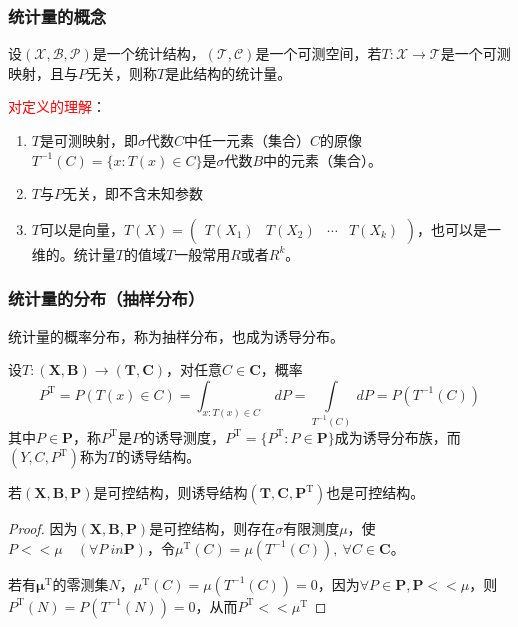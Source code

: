 \subsubsection{统计量的概念}
\begin{definition}[统计量]
    设$(\mathscr{X},\mathscr{B},\mathscr{P})$是一个统计结构，$(\mathscr{T},\mathscr{C})$是一个可测空间，若$T:\mathscr{X}\rightarrow \mathscr{T}$是一个可测映射，且与$P$无关，则称$T$是此结构的统计量。
\end{definition}
\textcolor{red}{对定义的理解}：
\begin{note}
    \begin{enumerate}[label = \arabic*\textsuperscript{$\circ$}]
        \item $T$是可测映射，即$\sigma$代数$C$中任一元素（集合）$C$的原像$T^{-1}(C)=\{x:T(x)\in C\}$是$\sigma$代数$B$中的元素（集合）。
        \item $T$与$P$无关，即不含未知参数
        \item $T$可以是向量，$T(X) = \begin{pmatrix}
            T(X_1) & T(X_2) & \cdots & T(X_k)
        \end{pmatrix}$，也可以是一维的。统计量$T$的值域$T$一般常用$R$或者$R^k$。
    \end{enumerate}
\end{note}
\subsubsection{统计量的分布（抽样分布）}

\begin{definition}[抽样分布]
    统计量的概率分布，称为抽样分布，也成为诱导分布。

    设$T:(\boldsymbol{X},\boldsymbol{B})\rightarrow (\boldsymbol{T},\boldsymbol{C})$，对任意$C\in \boldsymbol{C}$，概率
    \[
        P^{\mathrm{T}}=P(T(x)\in C) = \displaystyle\int_{x:T(x)\in C}\ dP = \displaystyle\int\limits_{T^{-1}(C)}\ dP = P(T^{-1}(C))
    \]
    其中$P\in \boldsymbol{P}$，称$P^{\mathrm{T}}$是$P$的诱导测度，$P^{\mathrm{T}} = \{ P^{\mathrm{T}}: P\in \boldsymbol{P}\}$成为诱导分布族，而$(Y,C,P^{\mathrm{T}})$称为$T$的诱导结构。
\end{definition}

\begin{note}
    若$(\boldsymbol{X},\boldsymbol{B},\boldsymbol{P})$是可控结构，则诱导结构$(\boldsymbol{T},\boldsymbol{C},\boldsymbol{P}^{\mathrm{T}})$也是可控结构。
\end{note}
\begin{proof}
    因为$(\boldsymbol{X},\boldsymbol{B},\boldsymbol{P})$是可控结构，则存在$\sigma$有限测度$\mu$，使$P<<\mu\quad (\forall P\ in \boldsymbol{P}) $，令$\mu^{\mathrm{T}}(C)=\mu(T^{-1}(C)),\ \forall C\in \boldsymbol{C}$。
    
    若有$\boldsymbol{\mu}^{\mathrm{T}}$的零测集$N$，$\mu^{\mathrm{T}}(C)=\mu(T^{-1}(C))=0$，因为$\forall P\in\boldsymbol{P},\boldsymbol{P}<<\mu$，则$P^{\mathrm{T}}(N)=P(T^{-1}(N))=0$，从而$P^\mathrm{T}<<\mu^{\mathrm{T}}$
\end{proof}

